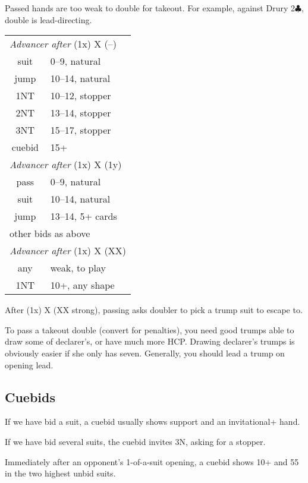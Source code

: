 \documentclass[a4paper, twoside, 11pt]{article}
\begin{document}
\begin{multicols}{3}
Passed hands are too weak to double for takeout. For example, against Drury 2$\clubsuit$, double is lead-directing.

\begin{center}
\begin{tabular}{ |cl| }
 \hline
 \multicolumn{2}{|l|}{\textit{Advancer after} (1x) X (--) } \\
 suit & 0--9, natural \\
 jump & 10--14, natural \\
 1NT &  10--12, stopper \\
 2NT &  13--14, stopper \\
 3NT &  15--17, stopper \\
 cuebid & 15+ \\
 \hline
 \multicolumn{2}{|l|}{\textit{Advancer after} (1x) X (1y) } \\
 pass & 0--9, natural \\
 suit & 10--14, natural \\
 jump & 13--14, 5+ cards\\
 \multicolumn{2}{|l|}{other bids as above} \\
 \hline
 \multicolumn{2}{|l|}{\textit{Advancer after} (1x) X (XX) } \\
 any & weak, to play \\
 1NT & 10+, any shape \\
 \hline
\end{tabular}
\end{center}


After (1x) X (XX strong), passing asks doubler to pick a trump suit to escape to.

To pass a takeout double (convert for penalties), you need good trumps able to draw some of declarer's, or have much more HCP. Drawing declarer's trumps is obviously easier if she only has seven. Generally, you should lead a trump on opening lead.

\subsection*{Cuebids}
If we have bid a suit, a cuebid usually shows support and an invitational+ hand.

If we have bid several suits, the cuebid invites 3N, asking for a stopper.

Immediately after an opponent's 1-of-a-suit opening, a cuebid shows 10+ and 55 in the two highest unbid suits.


\end{multicols}
\end{document}
